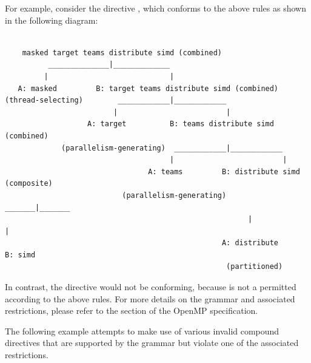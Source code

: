For example, consider the directive , which conforms to the above rules as shown in the following diagram:

\begin{Verbatim}[fontsize=\footnotesize]

    masked target teams distribute simd (combined)
          ______________|_____________
         |                            |
   A: masked         B: target teams distribute simd (combined)
(thread-selecting)        ____________|____________
                         |                         |
                   A: target          B: teams distribute simd (combined)
             (parallelism-generating)  ____________|____________
                                      |                         |
                                 A: teams         B: distribute simd (composite)
                           (parallelism-generating)      _______|_______
                                                        |               |
                                                  A: distribute      B: simd
                                                   (partitioned)

\end{Verbatim}

In contrast, the directive  would not be conforming,
because  is not a permitted  according to
the above rules. For more details on the grammar and associated restrictions,
please refer to the  section of the OpenMP
specification.

The following example attempts to make use of various invalid compound
directives that are supported by the grammar but violate one of the
associated restrictions.

